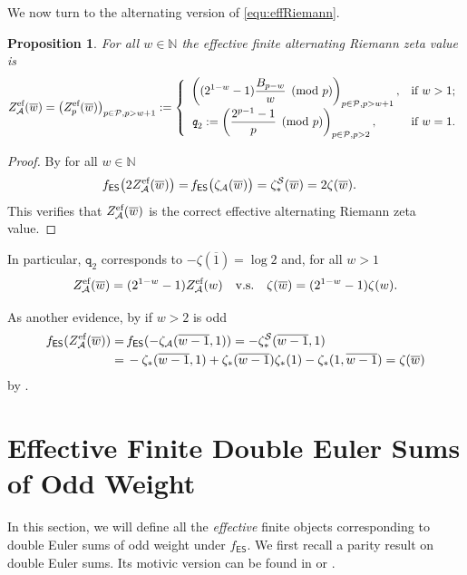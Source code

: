 \documentclass{article}
\newcommand{\ES}{\mathsf {ES}}
\newcommand{\Sy}{{\mathcal S}}
\newcommand{\tq}{{\texttt{q}}}
\newcommand{\calA}{\mathcal{A}}
\newcommand{\calP}{\mathcal{P}}
\newcommand{\eff}{\text{\rm{ef}}}
\newcommand{\N}{\mathbb{N}}
\newcommand{\ol}{\overline}
\theoremstyle{plain}
\newtheorem{prop}[thm]{Proposition}
\theoremstyle{definition}
\begin{document}
We now turn to the alternating version of \eqref{equ:effRiemann}.
\begin{prop}
For all $w\in\N$ the \emph{effective} finite alternating Riemann zeta value is
\begin{equation*}
    Z_\calA^\eff(\ol{w})=\big(Z_p^\eff(\ol{w})\big)_{p\in\calP,p>w+1}:=
\left\{
  \begin{array}{ll}
   \displaystyle   \left( (2^{1-w}-1) \frac{B_{p-w}}{w} \pmod{p} \right)_{p\in\calP,p>w+1} , & \hbox{if $w>1$;} \\
  \displaystyle   \emph{\tq}_2:=\left( \frac{2^{p-1}-1}{p} \pmod{p} \right)_{p\in\calP,p>2} , & \hbox{if $w=1$.}
  \end{array}
\right.
\end{equation*}
\end{prop}

\begin{proof}
By \cite[Thm. 8.2.7]{Zhao2016} for all $w\in\N$
\begin{align*}
    f_\ES\big( 2 Z_\calA^\eff(\ol{w})\big)=&\, f_\ES\big( \zeta_\calA(\ol{w})\big)= \zeta_\ast^\Sy(\ol{w})=2\zeta(\ol{w}).
\end{align*}
This verifies that $Z_\calA^\eff(\ol{w})$ is the correct effective alternating Riemann zeta value.
\end{proof}

In particular, $\tq_2$ corresponds to $-\zeta(\ol{1})=\log 2$ and, for all $w>1$
\begin{equation}\label{equ:ZbarByZ}
     Z_\calA^\eff(\ol{w})=(2^{1-w}-1)Z_\calA^\eff(w) \quad \text{v.s.}\quad \zeta(\ol{w})=(2^{1-w}-1)\zeta(w).
\end{equation}

As another evidence, by \cite[(8.52)]{Zhao2016} if $w>2$ is odd
\begin{align*}
    f_\ES( Z_\calA^\eff(\ol{w}))=&\, f_\ES( -\zeta_\calA(\ol{w-1},1) )= -\zeta_\ast^\Sy(\ol{w-1},1)\\
    =&\, -\zeta_\ast(\ol{w-1},1)+\zeta_\ast(\ol{w-1})\zeta_\ast(1)-\zeta_\ast(1,\ol{w-1}) = \zeta(\ol{w})
\end{align*}
by \cite[Thm. 4.2]{BCJXXZhao2020c}.


\section{Effective Finite Double Euler Sums of Odd Weight}\label{sec:depthTwoOddWt}
In this section, we will define all the \emph{effective} finite objects corresponding to double Euler sums of odd weight under $f_\ES$. We first recall a parity result on double Euler sums. Its motivic version can be found in \cite[Prop. 4.1]{XuZhao2023Oct} or \cite[Cor.~4.2.4]{Glanois2015}.
\end{document}
